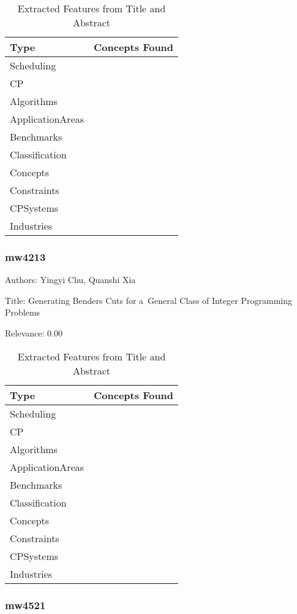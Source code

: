 {\scriptsize
\begin{longtable}{p{2cm}p{20cm}}
\caption{Extracted Features from Title and Abstract}\\ \toprule
Type & Concepts Found\\ \midrule
\endhead
\bottomrule
\endfoot
Scheduling & \\ 
CP & \\ 
Algorithms & \\ 
ApplicationAreas & \\ 
Benchmarks & \\ 
Classification & \\ 
Concepts & \\ 
Constraints & \\ 
CPSystems & \\ 
Industries & \\ 
\end{longtable}
}



\subsubsection{mw4213}
\label{mw:mw4213}

Authors: Yingyi Chu, Quanshi Xia

Title: Generating Benders Cuts for a General Class of Integer Programming Problems

Relevance:  0.00

{\scriptsize
\begin{longtable}{p{2cm}p{20cm}}
\caption{Extracted Features from Title and Abstract}\\ \toprule
Type & Concepts Found\\ \midrule
\endhead
\bottomrule
\endfoot
Scheduling & \\ 
CP & \\ 
Algorithms & \\ 
ApplicationAreas & \\ 
Benchmarks & \\ 
Classification & \\ 
Concepts & \\ 
Constraints & \\ 
CPSystems & \\ 
Industries & \\ 
\end{longtable}
}



\subsubsection{mw4521}
\label{mw:mw4521}

